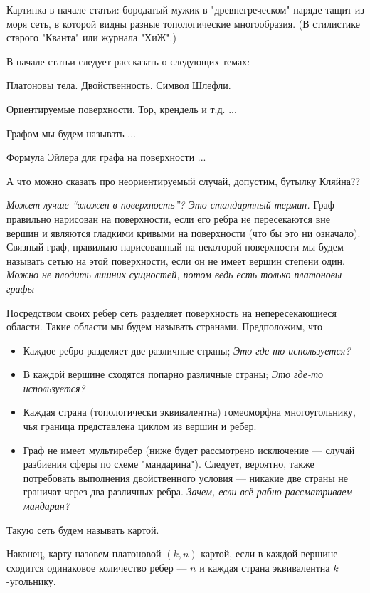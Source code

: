 \documentclass[12pt, a4paper, openany]{amsart}
\theoremstyle{plain}
\theoremstyle{definition}
\theoremstyle{remark}
\newcommand{\slavacom}[1]{{\color{blue}\it#1}}
\begin{document}
{\color{green}Картинка в начале статьи: бородатый мужик в
  "древнегреческом" наряде тащит из моря сеть, в которой видны разные
  топологические многообразия.  (В стилистике старого "Кванта" или
  журнала "ХиЖ".)}
	
	
{\color{green} В начале статьи следует рассказать о следующих темах:}
	
	
{\color{green}Платоновы тела. Двойственность. Символ Шлефли.}
		
{\color{green}Ориентируемые поверхности. Тор, крендель и т.д. ...}
		
{\color{green}Графом мы будем называть ...}
		
{\color{green}Формула Эйлера для графа на поверхности ...}
		
{\color{green} А что можно сказать про неориентируемый случай,
  допустим, бутылку Кляйна??}


\slavacom{Может лучше ``вложен в поверхность''? Это стандартный термин.}
Граф правильно нарисован на поверхности, если его ребра не
пересекаются вне вершин и являются гладкими кривыми на поверхности
(что бы это ни означало). Связный граф, правильно нарисованный на
некоторой поверхности мы будем называть сетью на этой поверхности,
если он не имеет вершин степени один.
\slavacom{Можно не плодить лишних сущностей, потом ведь есть только
  платоновы графы}


Посредством своих ребер сеть разделяет поверхность на непересекающиеся
области.  Такие области мы будем называть странами. Предположим, что
\begin{itemize}
\item Каждое ребро разделяет две различные страны;
  \slavacom{Это где-то используется?}
\item В каждой вершине сходятся попарно различные страны; 
  \slavacom{Это где-то используется?}
\item Каждая страна (топологически эквивалентна) гомеоморфна
  многоугольнику, чья граница представлена циклом из вершин и ребер.
\item Граф не имеет мультиребер (ниже будет рассмотрено исключение ---
  случай разбиения сферы по схеме "мандарина"). Следует, вероятно,
  также потребовать выполнения двойственного условия --- никакие две
  страны не граничат через два различных ребра.
   \slavacom{Зачем, если всё рабно рассматриваем мандарин?}
\end{itemize} 

Такую сеть будем называть картой.
	
Наконец, карту назовем платоновой $(k,n)$-картой, если в каждой
вершине сходится одинаковое количество ребер --- $n$ и каждая страна
эквивалентна $k$-угольнику.
\end{document}
